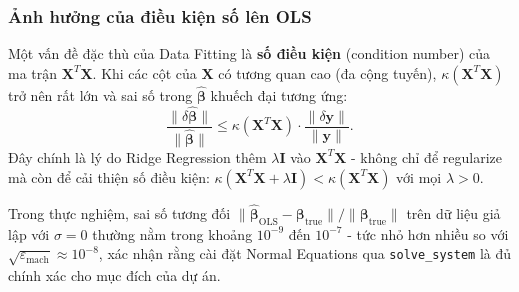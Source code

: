 \subsubsection{Ảnh hưởng của điều kiện số lên OLS}

Một vấn đề đặc thù của Data Fitting là \textbf{số điều kiện} (condition number) của ma trận $\mathbf{X}^T\mathbf{X}$. Khi các cột của $\mathbf{X}$ có tương quan cao (đa cộng tuyến), $\kappa(\mathbf{X}^T\mathbf{X})$ trở nên rất lớn và sai số trong $\hat{\boldsymbol{\beta}}$ khuếch đại tương ứng:
\begin{equation}
    \frac{\|\delta\hat{\boldsymbol{\beta}}\|}{\|\hat{\boldsymbol{\beta}}\|}
    \leq \kappa(\mathbf{X}^T\mathbf{X}) \cdot
    \frac{\|\delta\mathbf{y}\|}{\|\mathbf{y}\|}.
\end{equation}
Đây chính là lý do Ridge Regression thêm $\lambda\mathbf{I}$ vào $\mathbf{X}^T\mathbf{X}$ - không chỉ để regularize mà còn để cải thiện số điều kiện: $\kappa(\mathbf{X}^T\mathbf{X} + \lambda\mathbf{I}) < \kappa(\mathbf{X}^T\mathbf{X})$ với mọi $\lambda > 0$.

Trong thực nghiệm, sai số tương đối $\|\hat{\boldsymbol{\beta}}_{\mathrm{OLS}} - \boldsymbol{\beta}_{\mathrm{true}}\|/\|\boldsymbol{\beta}_{\mathrm{true}}\|$ trên dữ liệu giả lập với $\sigma = 0$ thường nằm trong khoảng $10^{-9}$ đến $10^{-7}$ - tức nhỏ hơn nhiều so với $\sqrt{\varepsilon_\text{mach}} \approx 10^{-8}$, xác nhận rằng cài đặt Normal Equations qua \texttt{solve\_system} là đủ chính xác cho mục đích của dự án.